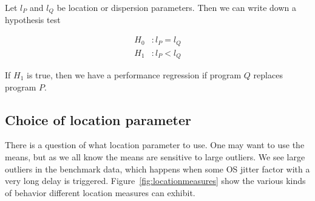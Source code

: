 \documentclass[conference]{IEEEtran}
\begin{document}
Let $l_P$ and $l_Q$ be location or dispersion parameters. Then we can write down a hypothesis test

\begin{subequations}
\begin{align}
H_0&: l_P = l_Q \\
H_1&: l_P < l_Q
\end{align}
\end{subequations}

If $H_1$ is true, then we have a performance regression if program $Q$ replaces program $P$.


\subsection{Choice of location parameter}

There is a question of what location parameter to use.
One may want to use the means, but as we all know the means are sensitive to large outliers. We see large outliers in the benchmark data, which happens when some OS jitter factor with a very long delay is triggered.
Figure~\ref{fig:locationmeasures} show the various kinds of behavior different location measures can exhibit.
\end{document}
